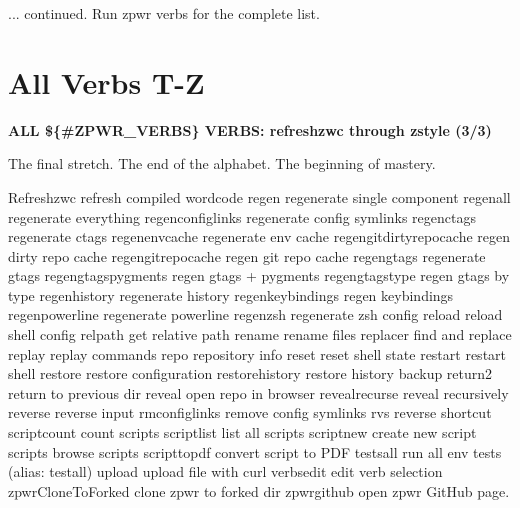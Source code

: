\documentclass[11pt,a4paper,twoside]{book}
\begin{document}
... continued. Run zpwr verbs for the complete list.


\vspace{16pt}

\section{All Verbs T-Z}


\vspace{10pt}
{\large\bfseries\color{neoncyan} ALL \$\{\#ZPWR\_VERBS\} VERBS: refreshzwc through zstyle (3/3)}\vspace{6pt}

The final stretch. The end of the alphabet. The beginning of mastery.

Refreshzwc                 refresh compiled wordcode regen                      regenerate single component regenall                   regenerate everything regenconfiglinks           regenerate config symlinks regenctags                 regenerate ctags regenenvcache              regenerate env cache regengitdirtyrepocache     regen dirty repo cache regengitrepocache          regen git repo cache regengtags                 regenerate gtags regengtagspygments         regen gtags + pygments regengtagstype             regen gtags by type regenhistory               regenerate history regenkeybindings           regen keybindings regenpowerline             regenerate powerline regenzsh                   regenerate zsh config reload                     reload shell config relpath                    get relative path rename                     rename files replacer                   find and replace replay                     replay commands repo                       repository info reset                      reset shell state restart                    restart shell restore                    restore configuration restorehistory             restore history backup return2                    return to previous dir reveal                     open repo in browser revealrecurse              reveal recursively reverse                    reverse input rmconfiglinks              remove config symlinks rvs                        reverse shortcut scriptcount                count scripts scriptlist                 list all scripts scriptnew                  create new script scripts                    browse scripts scripttopdf                convert script to PDF testsall                   run all env tests (alias: testall) upload                     upload file with curl verbsedit                  edit verb selection zpwrCloneToForked          clone zpwr to forked dir zpwrgithub                 open zpwr GitHub page.
\end{document}
